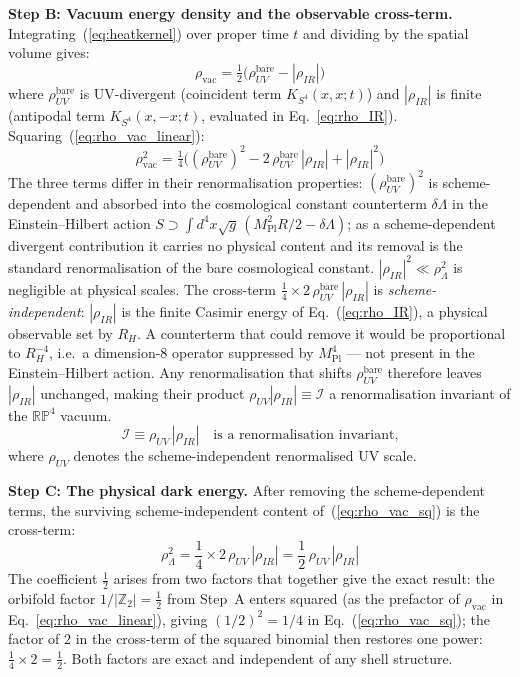 \documentclass[12pt,a4paper]{article}
\begin{document}
\textbf{Step B: Vacuum energy density and the observable cross-term.}
Integrating~(\ref{eq:heatkernel}) over proper time $t$ and dividing by the
spatial volume gives:
\begin{equation}
  \rho_\mathrm{vac} = \tfrac{1}{2}\bigl(\rho_{UV}^\mathrm{bare} - |\rho_{IR}|\bigr)
  \label{eq:rho_vac_linear}
\end{equation}
where $\rho_{UV}^\mathrm{bare}$ is UV-divergent (coincident term $K_{S^4}(x,x;t)$)
and $|\rho_{IR}|$ is finite (antipodal term $K_{S^4}(x,-x;t)$, evaluated in
Eq.~\ref{eq:rho_IR}).  Squaring~(\ref{eq:rho_vac_linear}):
\begin{equation}
  \rho_\mathrm{vac}^2 = \tfrac{1}{4}\bigl(
    (\rho_{UV}^\mathrm{bare})^2
    - 2\,\rho_{UV}^\mathrm{bare}\,|\rho_{IR}|
    + |\rho_{IR}|^2
  \bigr)
  \label{eq:rho_vac_sq}
\end{equation}
The three terms differ in their renormalisation properties:
$(\rho_{UV}^\mathrm{bare})^2$ is scheme-dependent and absorbed into the cosmological
constant counterterm $\delta\Lambda$ in the Einstein--Hilbert action
$S \supset \int\!d^4x\sqrt{g}\,(M_\mathrm{Pl}^2 R/2 - \delta\Lambda)$; as a
scheme-dependent divergent contribution it carries no physical content and its
removal is the standard renormalisation of the bare cosmological constant.
$|\rho_{IR}|^2 \ll \rho_\Lambda^2$ is negligible at physical scales.
The cross-term $\tfrac{1}{4}\times 2\,\rho_{UV}^\mathrm{bare}\,|\rho_{IR}|$ is
\emph{scheme-independent}: $|\rho_{IR}|$ is the finite Casimir energy of
Eq.~(\ref{eq:rho_IR}), a physical observable set by $R_H$. A counterterm that
could remove it would be proportional to $R_H^{-4}$, i.e.\ a dimension-8 operator
suppressed by $M_\mathrm{Pl}^4$ --- not present in the Einstein--Hilbert action.
Any renormalisation that shifts $\rho_{UV}^\mathrm{bare}$ therefore leaves
$|\rho_{IR}|$ unchanged, making their product $\rho_{UV}|\rho_{IR}| \equiv
\mathcal{I}$ a renormalisation invariant of the $\mathbb{RP}^4$ vacuum.
\begin{equation}
  \mathcal{I} \equiv \rho_{UV}\,|\rho_{IR}|
  \quad\text{is a renormalisation invariant,}
  \label{eq:RG_invariant}
\end{equation}
where $\rho_{UV}$ denotes the scheme-independent renormalised UV scale.

\textbf{Step C: The physical dark energy.}
After removing the scheme-dependent terms, the surviving scheme-independent
content of~(\ref{eq:rho_vac_sq}) is the cross-term:
\begin{equation}
  \rho_\Lambda^2
  = \frac{1}{4}\times 2\,\rho_{UV}\,|\rho_{IR}|
  = \frac{1}{2}\,\rho_{UV}\,|\rho_{IR}|
  \label{eq:seesaw_derived}
\end{equation}
The coefficient $\tfrac{1}{2}$ arises from two factors that together give the exact result:
the orbifold factor $1/|\mathbb{Z}_2| = \tfrac{1}{2}$ from Step~A enters squared
(as the prefactor of $\rho_\mathrm{vac}$ in Eq.~\ref{eq:rho_vac_linear}), giving
$(1/2)^2 = 1/4$ in Eq.~(\ref{eq:rho_vac_sq}); the factor of $2$ in the cross-term
of the squared binomial then restores one power: $\tfrac{1}{4}\times 2 = \tfrac{1}{2}$.
Both factors are exact and independent of any shell structure.
\end{document}
